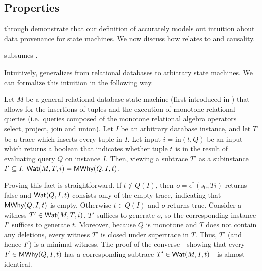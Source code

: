 \subsection{\WatProvenance{} Properties}
 through  demonstrate
that our definition of \watprovenance{} accurately models out intuition about
data provenance for state machines. We now discuss how \watprovenance{} relates
to \whyprovenance{} and causality.

%

\begin{claim}
  \Watprovenance{} subsumes \whyprovenance{}.
\end{claim}

\newcommand{\Min}{\text{in}}
Intuitively, \watprovenance{} generalizes \whyprovenance{} from relational
databases to arbitrary state machines. We can formalize this intuition in the
following way.

Let $M$ be a general relational database state machine (first introduced in
) that allows for the insertions of tuples and
the execution of monotone relational queries (i.e.\ queries composed of the
monotone relational algebra operators select, project, join and union). Let
$I$ be an arbitrary database instance, and let $T$ be a trace which inserts
every tuple in $I$. Let input $i = \Min(t, Q)$ be an input which returns a
boolean that indicates whether tuple $t$ is in the result of evaluating query
$Q$ on instance $I$. Then, viewing a subtrace $T'$ as a subinstance $I'
\subseteq I$, $\textsf{Wat}(M, T, i) = \textsf{MWhy}(Q, I, t)$.

Proving this fact is straightforward.
%
If $t \notin Q(I)$, then $o = \epsilon^*(s_0, Ti)$ returns false and $\textsf{Wat}(Q,
I, t)$ consists only of the empty trace, indicating that $\textsf{MWhy}(Q, I, t)$ is
empty.
%
Otherwise $t \in Q(I)$ and $o$ returns true. Consider a witness $T' \in \textsf{Wat}(M,
T, i)$. $T'$ suffices to generate $o$, so the corresponding instance $I'$
suffices to generate $t$. Moreover, because $Q$ is monotone and $T$ does not
contain any deletions, every witness $T'$ is closed under supertrace in $T$.
Thus, $T'$ (and hence $I'$) is a minimal witness. The proof of the
converse---showing that every $I' \in \textsf{MWhy}(Q, I, t)$ has a corresponding
subtrace $T' \in \textsf{Wat}(M, I, t)$---is almost identical.

